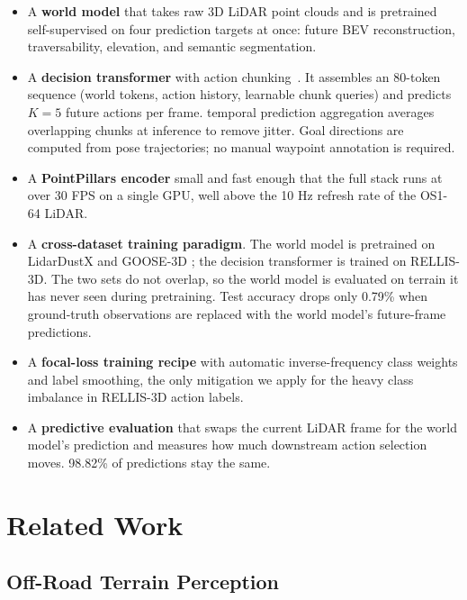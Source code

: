 \documentclass[sensors,article,submit,pdftex,moreauthors]{Definitions/mdpi}
\begin{document}
\begin{itemize}
    \item A \textbf{world model} that takes raw 3D LiDAR point clouds and is pretrained self-supervised on four prediction targets at once: future BEV reconstruction, traversability, elevation, and semantic segmentation.
    \item A \textbf{decision transformer} with action chunking~\cite{zhao2023act}. It assembles an 80-token sequence (world tokens, action history, learnable chunk queries) and predicts $K{=}5$ future actions per frame. temporal prediction aggregation averages overlapping chunks at inference to remove jitter. Goal directions are computed from pose trajectories; no manual waypoint annotation is required.
    \item A \textbf{PointPillars encoder} small and fast enough that the full stack runs at over 30 FPS on a single GPU, well above the 10 Hz refresh rate of the OS1-64 LiDAR.
    \item A \textbf{cross-dataset training paradigm}. The world model is pretrained on LidarDustX \cite{lidardust} and GOOSE-3D \cite{goose2024}; the decision transformer is trained on RELLIS-3D. The two sets do not overlap, so the world model is evaluated on terrain it has never seen during pretraining. Test accuracy drops only 0.79\% when ground-truth observations are replaced with the world model's future-frame predictions.
    \item A \textbf{focal-loss training recipe} with automatic inverse-frequency class weights and label smoothing, the only mitigation we apply for the heavy class imbalance in RELLIS-3D action labels.
    \item A \textbf{predictive evaluation} that swaps the current LiDAR frame for the world model's prediction and measures how much downstream action selection moves. 98.82\% of predictions stay the same.
\end{itemize}

\section{Related Work}
\label{sec:related_work}

\subsection{Off-Road Terrain Perception}
\end{document}
